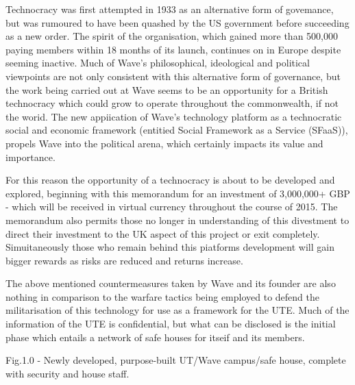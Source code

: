 \documentclass[letterpaper,10pt,openany,oneside,english]{sphinxmanual}
\begin{document}
Technocracy was first attempted in 1933 as an alternative form of govemance, but was rumoured to have been quashed by the US government before succeeding as a new order.
The spirit of the organisation, which gained more than 500,000 paying members within 18 months of its launch, continues on in Europe despite seeming inactive.
Much of Wave’s philosophical, ideological and political viewpoints are not only consistent with this alternative form of governance, but the work being carried out at Wave seems to be an opportunity for a British technocracy which could grow to operate throughout the commonwealth, if not the worid.
The new appiication of Wave’s technology platform as a technocratic social and economic framework (entitied Social Framework as a Service (SFaaS)), propels Wave into the political arena, which certainly impacts its value and importance.

For this reason the opportunity of a technocracy is about to be developed and explored, beginning with this memorandum for an investment of 3,000,000+ GBP - which will be received in virtual currency throughout the course of 2015. The memorandum also permits those no longer in understanding of this divestment to direct their investment to the UK aspect of this project or exit completely. Simuitaneously those who remain behind this piatforms development will gain bigger rewards as risks are reduced and returns increase.

The above mentioned countermeasures taken by Wave and its founder are also nothing in comparison to the warfare tactics being employed to defend the militarisation of this technology for use as a framework for the UTE. Much of the information of the UTE is confidential, but what can be disclosed is the initial phase which entails a network of safe houses for itseif and its members.

Fig.1.0 - Newly developed, purpose-built UT/Wave campus/safe house, complete with security and house staff.

\noindent{}
\end{document}
